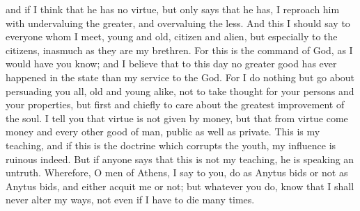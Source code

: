 and if I think that he has no virtue, but only says that he has, I
reproach him with undervaluing the greater, and overvaluing the less.
And this I should say to everyone whom I meet, young and old, citizen
and alien, but especially to the citizens, inasmuch as they are my
brethren. For this is the command of God, as I would have you know;
and I believe that to this day no greater good has ever happened in
the state than my service to the God. For I do nothing but go about
persuading you all, old and young alike, not to take thought for your
persons and your properties, but first and chiefly to care about the
greatest improvement of the soul. I tell you that virtue is not given
by money, but that from virtue come money and every other good of
man, public as well as private. This is my teaching, and if this is
the doctrine which corrupts the youth, my influence is ruinous indeed.
But if anyone says that this is not my teaching, he is speaking an
untruth. Wherefore, O men of Athens, I say to you, do as Anytus bids
or not as Anytus bids, and either acquit me or not; but whatever you
do, know that I shall never alter my ways, not even if I have to die
many times. 

